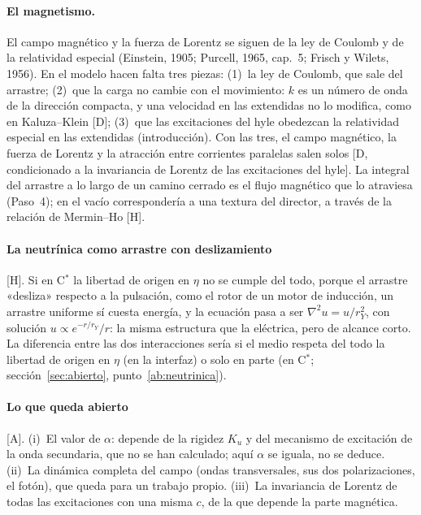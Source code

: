 \documentclass[11pt,a4paper]{article}
\newcommand{\st}[1]{\textup{[#1]}}
\newcommand{\Cst}{C\ensuremath{^{*}}}
\newcommand{\apartado}[1]{\paragraph{#1}}
\begin{document}
\apartado{El magnetismo.} El campo magnético y la fuerza de Lorentz se siguen de la ley de Coulomb y de la relatividad especial (Einstein, 1905; Purcell, 1965, cap.~5; Frisch y Wilets, 1956). En el modelo hacen falta tres piezas: (1)~la ley de Coulomb, que sale del arrastre; (2)~que la carga no cambie con el movimiento: $k$ es un número de onda de la dirección compacta, y una velocidad en las extendidas no lo modifica, como en Kaluza--Klein \st{D}; (3)~que las excitaciones del hyle obedezcan la relatividad especial en las extendidas (introducción). Con las tres, el campo magnético, la fuerza de Lorentz y la atracción entre corrientes paralelas salen solos \st{D, condicionado a la invariancia de Lorentz de las excitaciones del hyle}. La integral del arrastre a lo largo de un camino cerrado es el flujo magnético que lo atraviesa (Paso~4); en el vacío correspondería a una textura del director, a través de la relación de Mermin--Ho \st{H}.

\apartado{La neutrínica como arrastre con deslizamiento} \st{H}. Si en \Cst{} la libertad de origen en $\eta$ no se cumple del todo, porque el arrastre «desliza» respecto a la pulsación, como el rotor de un motor de inducción, un arrastre uniforme sí cuesta energía, y la ecuación pasa a ser $\nabla^2u=u/r_Y^2$, con solución $u\propto e^{-r/r_Y}/r$: la misma estructura que la eléctrica, pero de alcance corto. La diferencia entre las dos interacciones sería si el medio respeta del todo la libertad de origen en $\eta$ (en la interfaz) o solo en parte (en \Cst; sección~\ref{sec:abierto}, punto~\ref{ab:neutrinica}).

\apartado{Lo que queda abierto} \st{A}. (i)~El valor de $\alpha$: depende de la rigidez $K_u$ y del mecanismo de excitación de la onda secundaria, que no se han calculado; aquí $\alpha$ se iguala, no se deduce. (ii)~La dinámica completa del campo (ondas transversales, sus dos polarizaciones, el fotón), que queda para un trabajo propio. (iii)~La invariancia de Lorentz de todas las excitaciones con una misma $c$, de la que depende la parte magnética.
\end{document}
